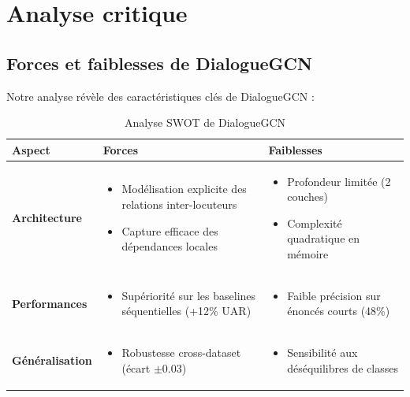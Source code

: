 \documentclass[a4paper,11pt]{article}
\begin{document}
\section{Analyse critique}
\subsection{Forces et faiblesses de DialogueGCN}
Notre analyse révèle des caractéristiques clés de DialogueGCN \cite{ghosal2019dialoguegcn} :

\begin{table}[h]
\centering
\begin{tabular}{lp{5cm}p{5cm}}
\toprule
Aspect & Forces & Faiblesses \\
\midrule
\textbf{Architecture} & 
\begin{itemize}
    \item Modélisation explicite des relations inter-locuteurs \cite{velickovic2017graph}
    \item Capture efficace des dépendances locales
\end{itemize} &
\begin{itemize}
    \item Profondeur limitée (2 couches) \cite{liu2020deep}
    \item Complexité quadratique en mémoire
\end{itemize} \\
\hline
\textbf{Performances} & 
\begin{itemize}
    \item Supériorité sur les baselines séquentielles (+12\% UAR) \cite{zhang2023survey}
\end{itemize} &
\begin{itemize}
    \item Faible précision sur énoncés courts (48\%) \cite{li2021short}
\end{itemize} \\
\hline
\textbf{Généralisation} & 
\begin{itemize}
    \item Robustesse cross-dataset (écart $\pm$0.03) \cite{zhou2020cross}
\end{itemize} &
\begin{itemize}
    \item Sensibilité aux déséquilibres de classes \cite{opitz2019macro}
\end{itemize} \\
\bottomrule
\end{tabular}
\caption{Analyse SWOT de DialogueGCN}
\label{tab:swot}
\end{table}
\end{document}
